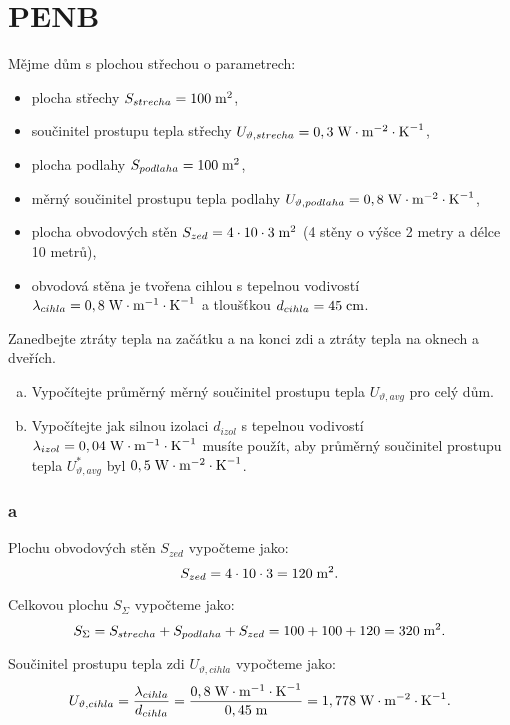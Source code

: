\documentclass{article}
\begin{document}
\section{ PENB \spicy \spicy}
Mějme dům s plochou střechou o parametrech:

\begin{itemize}
    \item plocha střechy $S_{strecha} = 100 \; \textrm{m}^{\textrm{2}}$,
    \item součinitel prostupu tepla střechy $U_{\vartheta,strecha} = 0,3 \; \textrm{W} \cdot \textrm{m}^{-2} \cdot \textrm{K}^{-1}$,
    \item plocha podlahy $S_{podlaha} = 100 \; \textrm{m}^{\textrm{2}}$,
    \item měrný součinitel prostupu tepla podlahy $U_{\vartheta,podlaha} = 0,8 \; \textrm{W} \cdot \textrm{m}^{-2} \cdot \textrm{K}^{-1}$,
    \item plocha obvodových stěn $S_{zed} = 4 \cdot 10 \cdot 3 \; \textrm{m}^{\textrm{2}}$ (4 stěny o výšce 2 metry a délce 10 metrů),
    \item obvodová stěna je tvořena cihlou s tepelnou vodivostí $\lambda_{cihla} = 0,8 \; \textrm{W} \cdot \textrm{m}^{-1} \cdot \textrm{K}^{-1}$ a tloušťkou $d_{cihla} = 45 \; \textrm{cm}$.
\end{itemize}

Zanedbejte ztráty tepla na začátku a na konci zdi a ztráty tepla na oknech a dveřích.

\begin{enumerate}[a)]
    \item Vypočítejte průměrný měrný součinitel prostupu tepla $U_{\vartheta,avg}$ pro celý dům.
    \item Vypočítejte jak silnou izolaci $d_{izol}$ s tepelnou vodivostí $\lambda_{izol} = 0,04 \; \textrm{W} \cdot \textrm{m}^{-1} \cdot \textrm{K}^{-1}$ musíte použít, aby průměrný součinitel prostupu tepla $U_{\vartheta,avg}^{*}$ byl $0,5 \; \textrm{W} \cdot \textrm{m}^{-2} \cdot \textrm{K}^{-1}$.
\end{enumerate}


\subsubsection{a}
Plochu obvodových stěn $S_{zed}$ vypočteme jako:
$$
    S_{zed} = 4 \cdot 10 \cdot 3 = 120 \; \textrm{m}^{\textrm{2}}.
$$

Celkovou plochu $S_{\Sigma}$ vypočteme jako:
$$
    S_{\Sigma} = S_{strecha} + S_{podlaha} + S_{zed} = 100 + 100 + 120 = 320 \; \textrm{m}^{\textrm{2}}.
$$

Součinitel prostupu tepla zdi $U_{\vartheta,cihla}$ vypočteme jako:
$$
    U_{\vartheta,cihla} = \frac{\lambda_{cihla}}{d_{cihla}} = \frac{0,8 \; \textrm{W} \cdot \textrm{m}^{-1} \cdot \textrm{K}^{-1}}{0,45 \; \textrm{m}} = 1,778 \; \textrm{W} \cdot \textrm{m}^{-2} \cdot \textrm{K}^{-1}.
$$
\end{document}
